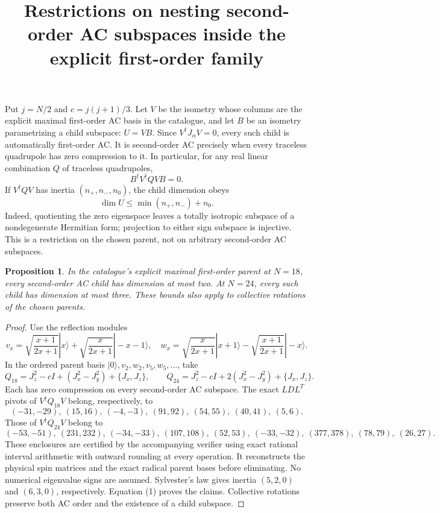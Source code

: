 \documentclass[11pt]{article}
\newtheorem{proposition}{Proposition}
\begin{document}
\title{Restrictions on nesting second-order AC subspaces inside the explicit first-order family}
\author{}\date{}\maketitle

Put $j=N/2$ and $c=j(j+1)/3$. Let $V$ be the isometry whose columns
are the explicit maximal first-order AC basis in the catalogue, and let
$B$ be an isometry parametrizing a child subspace: $U=VB$. Since
$V^\dagger J_\alpha V=0$, every such child is automatically first-order AC.
It is second-order AC precisely when every traceless quadrupole has zero
compression to it. In particular, for any real linear combination $Q$ of
traceless quadrupoles,
\[
 B^\dagger V^\dagger QVB=0.
\]
If $V^\dagger QV$ has inertia $(n_+,n_-,n_0)$, the child dimension obeys
\[
 \dim U\le \min(n_+,n_-)+n_0.
\tag{1}
\]
Indeed, quotienting the zero eigenspace leaves a totally isotropic
subspace of a nondegenerate Hermitian form; projection to either sign
subspace is injective. This is a restriction on the chosen parent,
not on arbitrary second-order AC subspaces.

\begin{proposition}
In the catalogue's explicit maximal first-order parent at $N=18$, every
second-order AC child has dimension at most two. At $N=24$, every such
child has dimension at most three. These bounds also apply to collective
rotations of the chosen parents.
\end{proposition}
\begin{proof}
Use the reflection modules
\[
 v_x=\sqrt{\frac{x+1}{2x+1}}|x\rangle+
     \sqrt{\frac{x}{2x+1}}|-x-1\rangle,
 \quad
 w_x=\sqrt{\frac{x}{2x+1}}|x+1\rangle-
     \sqrt{\frac{x+1}{2x+1}}|-x\rangle.
\]
In the ordered parent basis $|0\rangle,v_2,w_2,v_5,w_5,\ldots$, take
\[
 Q_{18}=J_z^2-cI+(J_x^2-J_y^2)+\{J_x,J_z\},
 \qquad
 Q_{24}=J_z^2-cI+2(J_x^2-J_y^2)+\{J_x,J_z\}.
\]
Each has zero compression on every second-order AC subspace.
The exact $LDL^T$ pivots of $V^\dagger Q_{18}V$ belong, respectively, to
\[
 (-31,-29),\ (15,16),\ (-4,-3),\ (91,92),\ (54,55),\ (40,41),\ (5,6).
\]
Those of $V^\dagger Q_{24}V$ belong to
\[
 (-53,-51),\ (231,232),\ (-34,-33),\ (107,108),\ (52,53),
 \ (-33,-32),\ (377,378),\ (78,79),\ (26,27).
\]
These enclosures are certified by the accompanying verifier using exact
rational interval arithmetic with outward rounding at every operation.
It reconstructs the physical spin matrices and the exact radical parent
bases before eliminating. No numerical eigenvalue signs are assumed.
Sylvester's law gives inertia $(5,2,0)$ and $(6,3,0)$, respectively.
Equation (1) proves the claims. Collective rotations preserve both AC
order and the existence of a child subspace.
\end{proof}
\end{document}
